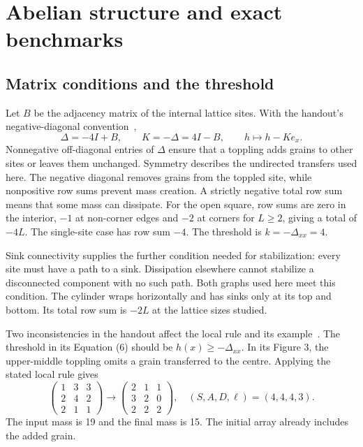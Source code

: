 \chapter{Abelian structure and exact benchmarks}\label{sec:theory}
\section{Matrix conditions and the threshold}\label{sec:matrix}
Let $B$ be the adjacency matrix of the internal lattice sites. With the handout's negative-diagonal convention~\cite{handout},
\begin{equation}
 \Delta=-4I+B,\qquad K=-\Delta=4I-B,\qquad h\longmapsto h-Ke_x.\label{eq:matrix}
\end{equation}
Nonnegative off-diagonal entries of $\Delta$ ensure that a toppling adds grains to other sites or leaves them unchanged. Symmetry describes the undirected transfers used here. The negative diagonal removes grains from the toppled site, while nonpositive row sums prevent mass creation. A strictly negative total row sum means that some mass can dissipate. For the open square, row sums are zero in the interior, $-1$ at non-corner edges and $-2$ at corners for $L\geq2$, giving a total of $-4L$. The single-site case has row sum $-4$. The threshold is $k=-\Delta_{xx}=4$.

Sink connectivity supplies the further condition needed for stabilization: every site must have a path to a sink. Dissipation elsewhere cannot stabilize a disconnected component with no such path. Both graphs used here meet this condition. The cylinder wraps horizontally and has sinks only at its top and bottom. Its total row sum is $-2L$ at the lattice sizes studied.

Two inconsistencies in the handout affect the local rule and its example~\cite[Eq. (6) and Fig. 3]{handout}. The threshold in its Equation (6) should be $h(x)\geq-\Delta_{xx}$. In its Figure 3, the upper-middle toppling omits a grain transferred to the centre. Applying the stated local rule gives
\begin{equation}
 \begin{pmatrix}1&3&3\\2&4&2\\2&1&1\end{pmatrix}
 \longrightarrow
 \begin{pmatrix}2&1&1\\3&2&0\\2&2&2\end{pmatrix},
 \quad (S,A,D,\ell)=(4,4,4,3).
\end{equation}
The input mass is 19 and the final mass is 15. The initial array already includes the added grain.

